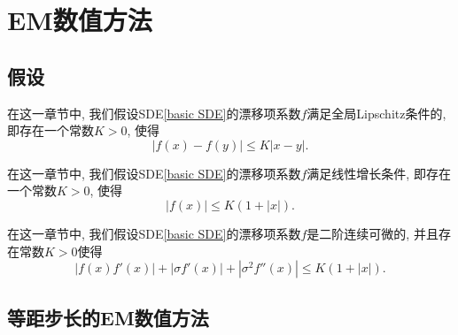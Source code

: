 

\chapter{EM数值方法}

\section{假设}
\begin{assumption}\label{Lipschitz}
	在这一章节中, 我们假设SDE\cref{basic SDE}的漂移项系数$f$满足全局\textnormal{Lipschitz}条件的, 即存在一个常数$K>0$, 使得
	\begin{equation}
		|f(x)-f(y)| \le K|x-y|. 
	\end{equation}
\end{assumption}

\begin{assumption}\label{linear growth}
	在这一章节中, 我们假设SDE\cref{basic SDE}的漂移项系数$f$满足线性增长条件, 即存在一个常数$K>0$, 使得
	\begin{equation}
		|f(x)| \le K(1+|x|). 
	\end{equation}
\end{assumption}


\begin{assumption}\label{momentEM}
	在这一章节中, 我们假设SDE\cref{basic SDE}的漂移项系数$f$是二阶连续可微的, 并且存在常数$K>0$使得
	\begin{equation}
		|f(x)f'(x)| + |\sigma f'(x)| + |\sigma^2 f''(x)| \leq K(1 + |x|).
	\end{equation}
	
\end{assumption}

\section{等距步长的EM数值方法}


